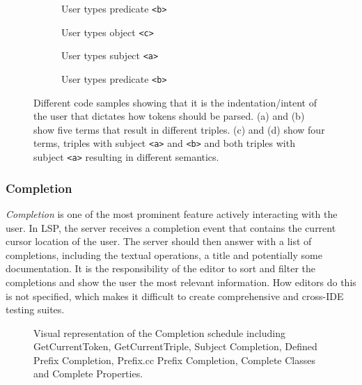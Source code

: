 \begin{figure}[tb]
    \centering
    \begin{subfigure}{0.21\textwidth}
      
      \caption{User types predicate \texttt{<b>}}
      \label{code1}
    \end{subfigure}
    \hfill
    \begin{subfigure}{0.21\textwidth}
      
      \caption{User types object \texttt{<c>}}
      \label{code2}
    \end{subfigure}
    \hfill
    \begin{subfigure}{0.21\textwidth}
      
      \caption{User types subject \texttt{<a>}}
      \label{code3}
    \end{subfigure}
    \hfill
    \begin{subfigure}{0.21\textwidth}
      
      \caption{User types predicate \texttt{<b>}}
      \label{code4}
    \end{subfigure}
    \caption{Different code samples showing that it is the indentation/intent of the user that dictates how tokens should be parsed. (a) and (b) show five terms that result in different triples. (c) and (d) show four terms, triples with subject \texttt{<a>} and \texttt{<b>} and both triples with subject \texttt{<a>} resulting in different semantics.    }\label{lst:GroupedListing}
\end{figure}



\subsubsection{Completion}

\textit{Completion} is one of the most prominent feature actively interacting with the user.
In LSP, the server receives a completion event that contains the current cursor location of the user.
The server should then answer with a list of completions, including the textual operations, a title and potentially some documentation.
It is the responsibility of the editor to sort and filter the completions and show the user the most relevant information.
How editors do this is not specified, which makes it difficult to create comprehensive and cross-IDE testing suites.

\begin{figure}[!ht]
 \centering
  \caption{Visual representation of the Completion schedule including GetCurrentToken, GetCurrentTriple, Subject Completion, Defined Prefix Completion, Prefix.cc Prefix Completion, Complete Classes and Complete Properties.}\label{fig:Completion}
\end{figure}

